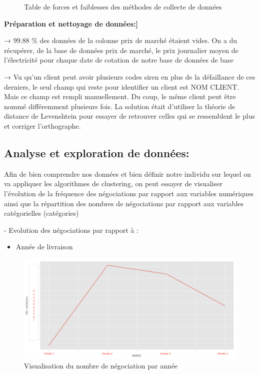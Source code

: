 \documentclass[12pt]{article}
\begin{document}
{%

\begin{figure}[H]
	\centering
     \caption{ Table de forces et faiblesses des méthodes de collecte de données }
    \label{fig:24}
\end{figure}


{\bf Préparation et nettoyage de données:]}

→ 99.88 \% des données de la colonne prix de marché étaient vides. On a du récupérer, de la base de données prix de marché, le prix journalier moyen de l'électricité pour chaque date de cotation de notre base de données de base

→ Vu qu’un client peut avoir plusieurs codes siren en plus de la défaillance de ces derniers, le seul champ qui reste pour identifier un client est NOM CLIENT. Mais ce champ est rempli manuellement. Du coup, le même client peut être nommé différemment plusieurs fois. La solution était d’utiliser la théorie de distance de Levenshtein pour essayer de retrouver celles qui se ressemblent le plus et corriger l'orthographe. 

\subsection{Analyse et exploration de données:}

Afin de bien comprendre nos données et bien définir notre individu sur lequel on va appliquer les algorithmes de clustering, on peut essayer de visualiser l’évolution de la fréquence des négociations par rapport aux variables numériques ainsi que la répartition des nombres de négociations par rapport aux variables catégorielles (catégories)


-	Evolution des négociations par rapport à :
\begin{itemize}
\item Année de livraison
\end{itemize}

\begin{figure}[H]
	\centering
    \includegraphics[width=1\textwidth]{image25.png}
     \caption{ Visualisation du nombre de négociation par année }
    \label{fig:25}
\end{figure}

}
\end{document}

